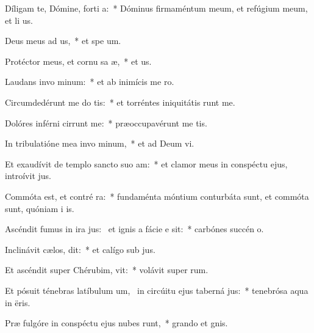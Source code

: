 \item Díligam te, Dómine, forti a:~* Dóminus firmaméntum meum, et refúgium meum, et li us.
\item Deus meus ad us,~* et spe  um.
\item Protéctor meus, et cornu sa æ,~* et  us.
\item Laudans invo minum:~* et ab inimícis me  ro.
\item Circumdedérunt me do tis:~* et torréntes iniquitátis runt me.
\item Dolóres inférni cirrunt me:~* præoccupavérunt me  tis.
\item In tribulatióne mea invo minum,~* et ad Deum  vi.
\item Et exaudívit de templo sancto suo  am:~* et clamor meus in conspéctu ejus, introívit   jus.
\item Commóta est, et contré ra:~* fundaménta móntium conturbáta sunt, et commóta sunt, quóniam i  is.
\item Ascéndit fumus in ira jus:~\pscross{} et ignis a fácie e sit:~* carbónes succén   o.
\item Inclinávit cælos,  dit:~* et calígo sub  jus.
\item Et ascéndit super Chérubim,  vit:~* volávit super  rum.
\item Et pósuit ténebras latíbulum um,~\pscross{} in circúitu ejus taberná jus:~* tenebrósa aqua in  ëris.
\item Præ fulgóre in conspéctu ejus nubes runt,~* grando et  gnis.

